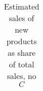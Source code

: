 \begin{table}[H]
  \vspace{-.cm}
  \centering
  \caption{Estimated sales of new products as share of total sales, no $C$}
  \footnotesize
    \begin{tabular}{lcc}
    \toprule
        
    \end{tabular}
  \label{tab:estinfty}
  \vspace{-.5cm}
\end{table}

\clearpage
